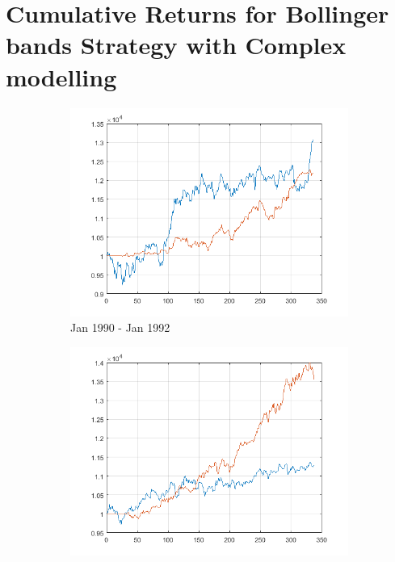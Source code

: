 \documentclass[11pt,a4,twosided,singlespacing,titlepagenumber=on]{scrreprt}
\numberwithin{equation}{chapter} %
\theoremstyle{remark}
\begin{document}
\section{Cumulative Returns for Bollinger bands Strategy with Complex modelling}
\label{app:portfolio_valuation_complex}

\begin{figure}[H]
    \centering
    \begin{subfigure}[t]{0.32\textwidth}
        \centering
        \includegraphics[width=1\textwidth]{res/backtest_cpx/1}
        \caption{Jan 1990 - Jan 1992}
    \end{subfigure}
    \begin{subfigure}[t]{0.32\textwidth}
        \centering
        \includegraphics[width=1\textwidth]{res/backtest_cpx/2}

\end{subfigure}
\end{figure}
\end{document}
